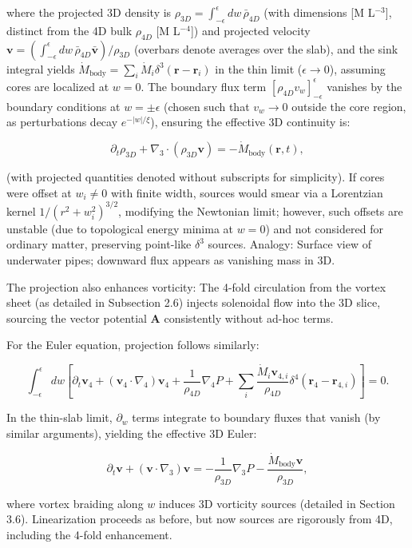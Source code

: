 \documentclass{article}
\begin{document}
where the projected 3D density is $\rho_{3D} = \int_{-\epsilon}^{\epsilon} dw \, \bar{\rho}_{4D}$ (with dimensions [M L$^{-3}$], distinct from the 4D bulk $\rho_{4D}$ [M L$^{-4}$]) and projected velocity $\mathbf{v} = \left( \int_{-\epsilon}^{\epsilon} dw \, \bar{\rho}_{4D} \bar{\mathbf{v}} \right) / \rho_{3D}$ (overbars denote averages over the slab), and the sink integral yields $\dot{M}_{\text{body}} = \sum_i \dot{M}_i \delta^3(\mathbf{r} - \mathbf{r}_i)$ in the thin limit ($\epsilon \to 0$), assuming cores are localized at $w=0$. The boundary flux term $[\rho_{4D} v_w]_{-\epsilon}^{\epsilon}$ vanishes by the boundary conditions at $w = \pm \epsilon$ (chosen such that $v_w \to 0$ outside the core region, as perturbations decay $e^{-|w|/ \xi}$), ensuring the effective 3D continuity is:

\[
\partial_t \rho_{3D} + \nabla_3 \cdot (\rho_{3D} \mathbf{v}) = - \dot{M}_{\text{body}}(\mathbf{r}, t),
\]

(with projected quantities denoted without subscripts for simplicity). If cores were offset at $w_i \neq 0$ with finite width, sources would smear via a Lorentzian kernel $1/(r^2 + w_i^2)^{3/2}$, modifying the Newtonian limit; however, such offsets are unstable (due to topological energy minima at $w=0$) and not considered for ordinary matter, preserving point-like $\delta^3$ sources. Analogy: Surface view of underwater pipes; downward flux appears as vanishing mass in 3D.

The projection also enhances vorticity: The 4-fold circulation from the vortex sheet (as detailed in Subsection 2.6) injects solenoidal flow into the 3D slice, sourcing the vector potential $\mathbf{A}$ consistently without ad-hoc terms.

For the Euler equation, projection follows similarly:

\[
\int_{-\epsilon}^{\epsilon} dw \left[ \partial_t \mathbf{v}_4 + (\mathbf{v}_4 \cdot \nabla_4) \mathbf{v}_4 + \frac{1}{\rho_{4D}} \nabla_4 P + \sum_i \frac{\dot{M}_i \mathbf{v}_{4,i}}{\rho_{4D}} \delta^4(\mathbf{r}_4 - \mathbf{r}_{4,i}) \right] = 0.
\]

In the thin-slab limit, $\partial_w$ terms integrate to boundary fluxes that vanish (by similar arguments), yielding the effective 3D Euler:

\[
\partial_t \mathbf{v} + (\mathbf{v} \cdot \nabla_3) \mathbf{v} = -\frac{1}{\rho_{3D}} \nabla_3 P - \frac{\dot{M}_{\text{body}} \mathbf{v}}{\rho_{3D}},
\]

where vortex braiding along $w$ induces 3D vorticity sources (detailed in Section 3.6). Linearization proceeds as before, but now sources are rigorously from 4D, including the 4-fold enhancement.
\end{document}
